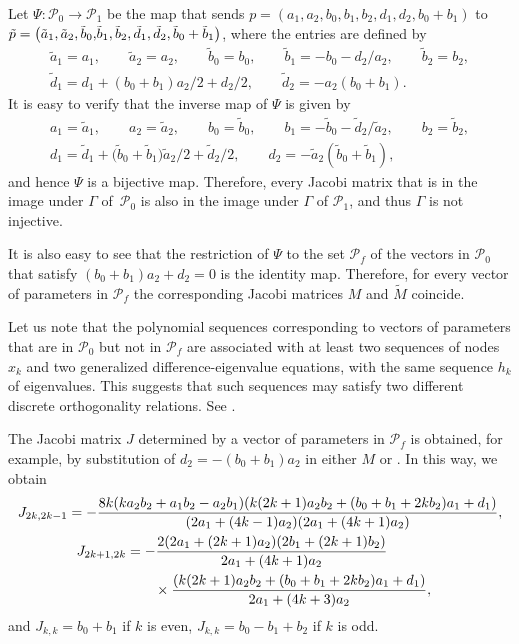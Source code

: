 \documentclass[pdftex]{sigma}
\def\cP{\mathcal P}
\numberwithin{equation}{section}
\begin{document}
Let $\Psi\colon \cP_0 \rightarrow \cP_1$ be the map that sends $p=(a_1, a_2, b_0, b_1, b_2, d_1,d_2, b_0+b_1)$ to $\tilde p=\smash{\bigl(\tilde a_1,\tilde a_2,\tilde b_0,} \allowbreak \smash{\tilde b_1,\tilde b_2,\tilde d_1,\tilde d_2,\tilde b_0+ \tilde b_1\bigr)}$, where the entries are defined by
\begin{gather*}
\tilde a_1=a_1,\qquad \tilde a_2=a_2, \qquad \tilde b_0=b_0,\qquad \tilde b_1= -b_0 -d_2/a_2,\qquad \tilde b_2=b_2, \\
\tilde d_1=d_1+(b_0+b_1) a_2/2 + d_2/2,\qquad \tilde d_2=-a_2 (b_0+b_1).
\end{gather*}
It is easy to verify that the inverse map of $\Psi$ is given by
\begin{gather*}
 a_1=\tilde a_1,\qquad a_2=\tilde a_2, \qquad b_0=\tilde b_0,\qquad b_1= -\tilde b_0 -\tilde d_2/\tilde a_2,\qquad b_2=\tilde b_2, \\
d_1=\tilde d_1+\bigl(\tilde b_0+\tilde b_1\bigr) \tilde a_2/2 + \tilde d_2/2,\qquad d_2=-\tilde a_2 (\tilde b_0+\tilde b_1),
\end{gather*}
and hence $\Psi$ is a bijective map. Therefore, every Jacobi matrix that is in the image under $\Gamma$ of~$\cP_0$ is also in the image under $\Gamma$ of $\cP_1$, and thus $\Gamma$ is not injective.

It is also easy to see that the restriction of $\Psi$ to the set $\cP_f$ of the vectors in $\cP_0$ that satisfy $(b_0+b_1) a_2+d_2=0$ is the identity map.
Therefore, for every vector of parameters in $\cP_f$ the corresponding Jacobi matrices $M$ and $\tilde M$ coincide.

Let us note that the polynomial sequences corresponding to vectors of parameters that are in $\cP_0$ but not in $\cP_f$ are associated with at least two sequences of nodes $x_k$ and two generalized difference-eigenvalue equations, with the same sequence $h_k$ of eigenvalues. This suggests that such sequences may satisfy two different discrete orthogonality relations. See \cite{qdiscr}.

The Jacobi matrix $J$ determined by a vector of parameters in $\cP_f$ is obtained, for example, by substitution of $d_2=-(b_0+b_1)a_2$ in either $M$ or . In this way, we obtain %
\begin{gather*}%
	J_{2k,2k-1}= -\dfrac{8k(k a_2 b_2+ a_1 b_2-a_2 b_1) ( k(2k+1) a_2 b_2+(b_0+b_1+2 k b_2)a_1+d_1)}{(2 a_1+(4k-1) a_2) (2 a_1+(4k+1) a_2)},
\\
	J_{2k+1,2k}=-\dfrac{2 (2 a_1+(2k+1)a_2) (2 b_1 + ( 2k+1) b_2)}{2 a_1+(4k+1) a_2} \qquad \qquad \nonumber \\
\hphantom{J_{2k+1,2k}=}\hspace{0.25mm}{}
 \times 	\dfrac{( k(2k+1) a_2 b_2+(b_0+b_1+2 k b_2)a_1+d_1)}{2 a_1 +(4k+3) a_2}, \nonumber
\end{gather*}
and
$%
	J_{k,k}= b_0+b_1$ if $k$ is even,
	$J_{k,k}= b_0-b_1+b_2$ if $k$ is odd.
\end{document}
